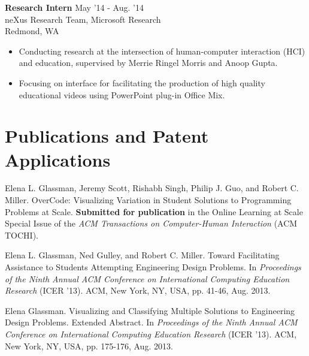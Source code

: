 \documentclass[margin]{res}
\begin{document}
\begin{resume}
{\bf Research Intern} \hfill May '14 - Aug. '14 \\ neXus Research Team, Microsoft Research \\ Redmond, WA 
 \begin{itemize} \itemsep -2pt  %
 \item Conducting research at the intersection of human-computer interaction (HCI) and education, supervised by Merrie Ringel Morris and Anoop Gupta. 
 \item Focusing on interface for facilitating the production of high quality educational videos using PowerPoint plug-in Office Mix.

\end{itemize}
 
\section{Publications and Patent Applications}


Elena L. Glassman, Jeremy Scott, Rishabh Singh, Philip J. Guo, and Robert C. Miller. OverCode: Visualizing Variation in Student Solutions to Programming Problems at Scale. {\bf Submitted for publication} in the Online Learning at Scale Special Issue of the {\it ACM Transactions on Computer-Human Interaction} (ACM TOCHI).

Elena L. Glassman, Ned Gulley, and Robert C. Miller. Toward Facilitating Assistance to Students Attempting Engineering Design Problems. In {\it Proceedings of the Ninth Annual ACM Conference on International Computing Education Research} (ICER '13). ACM, New York, NY, USA, pp. 41-46, Aug. 2013.


Elena Glassman. Visualizing and Classifying Multiple Solutions to Engineering Design Problems. Extended Abstract. In {\it Proceedings of the Ninth Annual ACM Conference on International Computing Education Research} (ICER '13). ACM, New York, NY, USA, pp. 175-176, Aug. 2013.


\end{resume}
\end{document}
